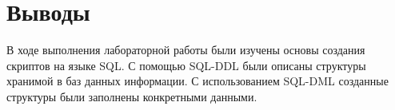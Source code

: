 \section{Выводы}

В ходе выполнения лабораторной работы были изучены основы создания скриптов на языке SQL. С помощью SQL-DDL были описаны структуры хранимой в баз данных информации. С использованием SQL-DML созданные структуры были заполнены конкретными данными. 



